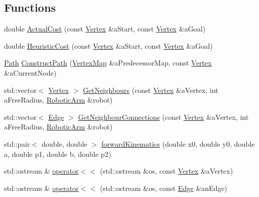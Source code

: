 \subsection*{Functions}
\begin{DoxyCompactItemize}
\item 
double \hyperlink{namespace_path_algorithm_a303daba8d3a083b341d1f4a799c3d5e4}{Actual\+Cost} (const \hyperlink{struct_path_algorithm_1_1_vertex}{Vertex} \&a\+Start, const \hyperlink{struct_path_algorithm_1_1_vertex}{Vertex} \&a\+Goal)
\item 
double \hyperlink{namespace_path_algorithm_a2e4474691c7ebd46c7238f2c53b0e543}{Heuristic\+Cost} (const \hyperlink{struct_path_algorithm_1_1_vertex}{Vertex} \&a\+Start, const \hyperlink{struct_path_algorithm_1_1_vertex}{Vertex} \&a\+Goal)
\item 
\hyperlink{namespace_path_algorithm_a7f2958a43117506f3cb6dc9409a22c0d}{Path} \hyperlink{namespace_path_algorithm_a1b72e8125a5f9fa31d3130c816f1a03f}{Construct\+Path} (\hyperlink{namespace_path_algorithm_ac8a52a9740a0bfa959810bd92e08d962}{Vertex\+Map} \&a\+Predecessor\+Map, const \hyperlink{struct_path_algorithm_1_1_vertex}{Vertex} \&a\+Current\+Node)
\item 
std\+::vector$<$ \hyperlink{struct_path_algorithm_1_1_vertex}{Vertex} $>$ \hyperlink{namespace_path_algorithm_ae4490c66af669f70064a693a8d7a889e}{Get\+Neighbours} (const \hyperlink{struct_path_algorithm_1_1_vertex}{Vertex} \&a\+Vertex, int a\+Free\+Radius, \hyperlink{class_robotic_arm}{Robotic\+Arm} \&robot)
\item 
std\+::vector$<$ \hyperlink{struct_path_algorithm_1_1_edge}{Edge} $>$ \hyperlink{namespace_path_algorithm_a8f0c4453fa932953ae67e31855f68197}{Get\+Neighbour\+Connections} (const \hyperlink{struct_path_algorithm_1_1_vertex}{Vertex} \&a\+Vertex, int a\+Free\+Radius, \hyperlink{class_robotic_arm}{Robotic\+Arm} \&robot)
\item 
std\+::pair$<$ double, double $>$ \hyperlink{namespace_path_algorithm_aaa1cdbf02ad31d9d9f0161839a1af45d}{forward\+Kinematics} (double x0, double y0, double a, double p1, double b, double p2)
\item 
std\+::ostream \& \hyperlink{namespace_path_algorithm_a7570fe9b9ed95b023311d0b9ef75b7ea}{operator$<$$<$} (std\+::ostream \&os, const \hyperlink{struct_path_algorithm_1_1_vertex}{Vertex} \&a\+Vertex)
\item 
std\+::ostream \& \hyperlink{namespace_path_algorithm_a4d00bd2dacc6db331429deab0d46cbf3}{operator$<$$<$} (std\+::ostream \&os, const \hyperlink{struct_path_algorithm_1_1_edge}{Edge} \&an\+Edge)
\end{DoxyCompactItemize}


